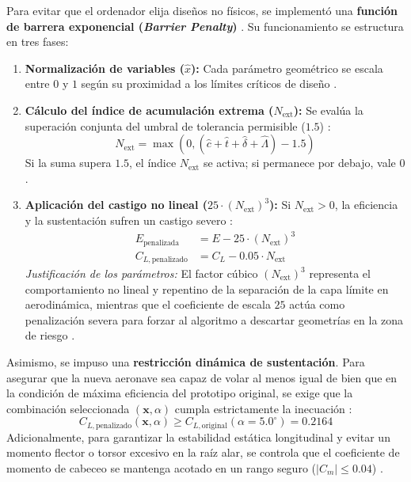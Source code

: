 \documentclass[11pt, a4paper]{article}
\begin{document}
Para evitar que el ordenador elija diseños no físicos, se implementó una \textbf{función de barrera exponencial (\textit{Barrier Penalty})} \cite{anderson}. Su funcionamiento se estructura en tres fases:
\begin{enumerate}
    \item \textbf{Normalización de variables ($\hat{x}$):} Cada parámetro geométrico se escala entre $0$ y $1$ según su proximidad a los límites críticos de diseño \cite{anderson}.
    \item \textbf{Cálculo del índice de acumulación extrema ($N_{\text{ext}}$):} Se evalúa la superación conjunta del umbral de tolerancia permisible ($1.5$) \cite{anderson}:
    \begin{equation}
        N_{\text{ext}} = \max\left(0, \left( \hat{c} + \hat{t} + \hat{\delta} + \hat{\Lambda} \right) - 1.5\right)
    \end{equation}
    Si la suma supera $1.5$, el índice $N_{\text{ext}}$ se activa; si permanece por debajo, vale $0$ \cite{anderson}.
    \item \textbf{Aplicación del castigo no lineal ($25 \cdot (N_{\text{ext}})^3$):} Si $N_{\text{ext}} > 0$, la eficiencia y la sustentación sufren un castigo severo \cite{anderson}:
    \begin{align}
        E_{\text{penalizada}} &= E - 25 \cdot (N_{\text{ext}})^3 \\
        C_{L,\text{penalizado}} &= C_L - 0.05 \cdot N_{\text{ext}}
    \end{align}
    \textit{Justificación de los parámetros:} El factor cúbico $(N_{\text{ext}})^3$ representa el comportamiento no lineal y repentino de la separación de la capa límite en aerodinámica, mientras que el coeficiente de escala $25$ actúa como penalización severa para forzar al algoritmo a descartar geometrías en la zona de riesgo \cite{anderson}.
\end{enumerate}

Asimismo, se impuso una \textbf{restricción dinámica de sustentación}. Para asegurar que la nueva aeronave sea capaz de volar al menos igual de bien que en la condición de máxima eficiencia del prototipo original, se exige que la combinación seleccionada $(\mathbf{x}, \alpha)$ cumpla estrictamente la inecuación \cite{raymer, anderson}:
\begin{equation}
    C_{L,\text{penalizado}}(\mathbf{x}, \alpha) \ge C_{L,\text{original}}(\alpha = 5.0^\circ) = 0.2164
\end{equation}
Adicionalmente, para garantizar la estabilidad estática longitudinal y evitar un momento flector o torsor excesivo en la raíz alar, se controla que el coeficiente de momento de cabeceo se mantenga acotado en un rango seguro ($\vert C_m \vert \le 0.04$) \cite{anderson}.
\end{document}
